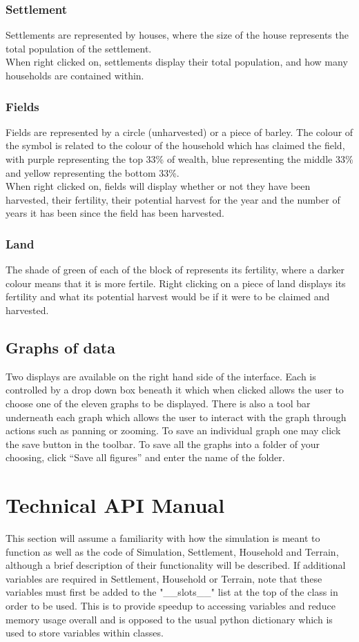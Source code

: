 \documentclass[12pt]{article}
\begin{document}
			\subsubsection{Settlement}
				Settlements are represented by houses, where the size of the house represents the total population of the settlement.\\
				When right clicked on, settlements display their total population, and how many households are contained within.\\
			\subsubsection{Fields}
				Fields are represented by a circle (unharvested) or a piece of barley. The colour of the symbol is related to the colour of the household which has claimed the field, with purple representing the top 33\% of wealth, blue representing the middle 33\% and yellow representing the bottom 33\%.\\
				When right clicked on, fields will display whether or not they have been harvested, their fertility, their potential harvest for the year and the number of years it has been since the field has been harvested.\\
			\subsubsection{Land}
				The shade of green of each of the block of represents its fertility, where a darker colour means that it is more fertile. Right clicking on a piece of land displays its fertility and what its potential harvest would be if it were to be claimed and harvested.
				
		\subsection{Graphs of data}
			Two displays are available on the right hand side of the interface. Each is controlled by a drop down box beneath it which when clicked allows the user to choose one of the eleven graphs to be displayed. There is also a tool bar underneath each graph which allows the user to interact with the graph through actions such as panning or zooming. To save an individual graph one may click the save button in the toolbar. To save all the graphs into a folder of your choosing, click “Save all figures” and enter the name of the folder. 
			
	\section{Technical API Manual}
		This section will assume a familiarity with how the simulation is meant to function as well as the code of Simulation, Settlement, Household and Terrain, although a brief description of their functionality will be described. If additional variables are required in Settlement, Household or Terrain, note that these variables must first be added to the "\_\_slots\_\_" list at the top of the class in order to be used. This is to provide speedup to accessing variables and reduce memory usage overall and is opposed to the usual python dictionary which is used to store variables within classes.
\end{document}
